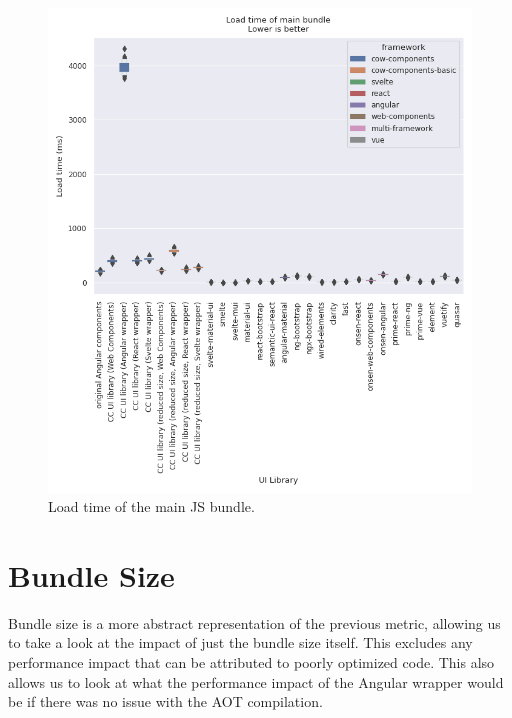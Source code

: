 \begin{figure}[h]
  \includegraphics[width=\columnwidth]{plots/load-time-all.png}
  \caption{Load time of the main JS bundle.}
  \label{fig:results:load-time-all}
  \centering
\end{figure}

\section{Bundle Size}
Bundle size is a more abstract representation of the previous metric, allowing us to take a look at the impact of just the bundle size itself. This excludes any performance impact that can be attributed to poorly optimized code. This also allows us to look at what the performance impact of the Angular wrapper would be if there was no issue with the AOT compilation.

